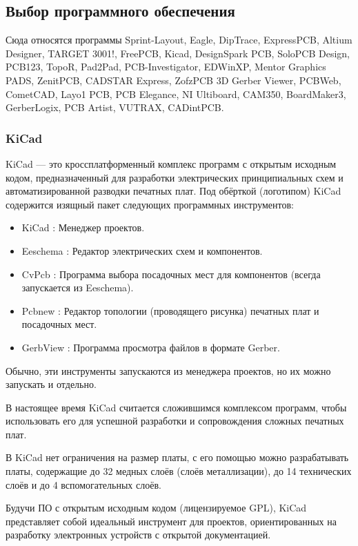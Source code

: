 \subsection{Выбор программного обеспечения}
Сюда относятся программы Sprint-Layout, Eagle, DipTrace, ExpressPCB, Altium Designer, TARGET 3001!,
FreePCB, Kicad, DesignSpark PCB, SoloPCB Design, PCB123, TopoR, Pad2Pad, PCB-Investigator, EDWinXP,
Mentor Graphics PADS, ZenitPCB, CADSTAR Express, ZofzPCB 3D Gerber Viewer, PCBWeb, CometCAD, Layo1
PCB, PCB Elegance, NI Ultiboard, CAM350, BoardMaker3, GerberLogix, PCB Artist, VUTRAX, CADintPCB.

\subsubsection{KiCad}
KiCad — это кроссплатформенный комплекс программ с открытым исходным кодом, предназначенный для разработки электрических принципиальных схем и автоматизированной разводки печатных плат. Под обёрткой (логотипом) KiCad содержится изящный пакет следующих программных инструментов:

\begin{itemize}
    \item KiCad : Менеджер проектов.
    \item Eeschema : Редактор электрических схем и компонентов.
    \item CvPcb : Программа выбора посадочных мест для компонентов (всегда запускается из Eeschema).
    \item Pcbnew : Редактор топологии (проводящего рисунка) печатных плат и посадочных мест.
    \item GerbView : Программа просмотра файлов в формате Gerber.

\end{itemize}


Обычно, эти инструменты запускаются из менеджера проектов, но их можно запускать и отдельно.


В настоящее время KiCad считается сложившимся комплексом программ, чтобы использовать его для успешной разработки и сопровождения сложных печатных плат.


В KiCad нет ограничения на размер платы, с его помощью можно разрабатывать платы, содержащие до 32 медных слоёв (слоёв металлизации), до 14 технических слоёв и до 4 вспомогательных слоёв.


Будучи ПО с открытым исходным кодом (лицензируемое GPL), KiCad представляет собой идеальный инструмент для проектов, ориентированных на разработку электронных устройств с открытой документацией.

